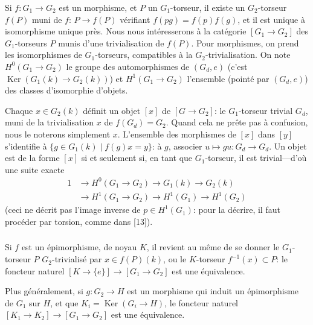 \documentclass[12pt,a4paper]{article}
\theoremstyle{plain}
\theoremstyle{definition}
\theoremstyle{remark}
\DeclareMathOperator{\Ker}{Ker}
\begin{document}
Si $f:G_1 \to G_2$ est un morphisme, et $P$ un $G_1$-torseur, il existe un $G_2$-torseur $f(P)$ muni de $f$: $P \to f(P)$ v\'erifiant $f(pg) = f(p)f(g)$, et il est unique \`a isomorphisme unique pr\`es. Nous nous int\'eresserons \`a la cat\'egorie $[G_1 \to G_2]$ des $G_1$-torseurs $P$ munis d'une trivialisation de $f(P)$. Pour morphismes, on prend les isomorphismes de $G_1$-torseurs, compatibles \`a la $G_2$-trivialisation. On note $H^0(G_1 \to G_2)$ le groupe des automorphismes de $(G_d,e)$ (c'est $\Ker(G_1(k) \to G_2(k))$) et $H^1(G_1 \to G_2)$ l'ensemble (point\'e par $(G_d,e)$) des classes d'isomorphie d'objets.

Chaque $x \in G_2(k)$ d\'efinit un objet $[x]$ de $[G \to G_2]$: le $G_1$-torseur trivial $G_d$, muni de la trivialisation $x$ de $f(G_d) = G_2$. Quand cela ne pr\^ete pas \`a confusion, nous le noterons simplement $x$. L'ensemble des morphismes de $[x]$ dans $[y]$ s'identifie \`a $\{g \in G_1(k) \mid f(g)x = y\}$: \`a $g$, associer $u \mapsto gu: G_d \to G_d$. Un objet est de la forme $[x]$ si et seulement si, en tant que $G_1$-torseur, il est trivial---d'o\`u une suite exacte
\begin{equation}\label{eq:2.4.3.1}
\begin{split}
1 &\to H^0(G_1 \to G_2) \to G_1(k) \to G_2(k) \\
&\to H^1(G_1 \to G_2) \to H^1(G_1) \to H^1(G_2)
\end{split}
\end{equation}
(ceci ne d\'ecrit pas l'image inverse de $p \in H^1(G_1)$: pour la d\'ecrire, il faut proc\'eder par torsion, comme dans [13]).

\subsubsection{}

Si $f$ est un \'epimorphisme, de noyau $K$, il revient au m\^eme de se donner le $G_1$-torseur $P$ $G_2$-trivialis\'e par $x \in f(P)(k)$, ou le $K$-torseur $f^{-1}(x) \subset P$: le foncteur naturel $[K \to \{e\}] \to [G_1 \to G_2]$ est une \'equivalence.

Plus g\'en\'eralement, si $g:G_2 \to H$ est un morphisme qui induit un \'epimorphisme de $G_1$ sur $H$, et que $K_i = \Ker(G_i \to H)$, le foncteur naturel $[K_1 \to K_2] \to [G_1 \to G_2]$ est une \'equivalence.

\subsubsection{}
\end{document}

